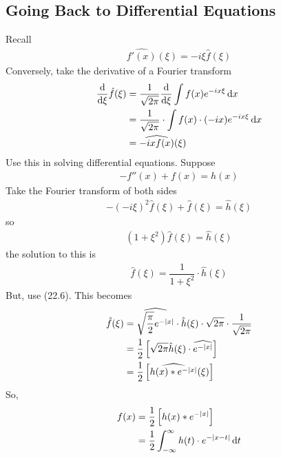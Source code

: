 \subsection{Going Back to Differential Equations}
Recall
\begin{align}
    \widehat{f'(x)}(\xi) = -i\xi \hat{f}(\xi)
\end{align}
Conversely, take the derivative of a Fourier transform
\begin{align}
    \dv{\xi} \hat{f}(\xi) &= \dfrac{1}{\sqrt{2\pi}} \dv{\xi} \int f(x) e^{-ix\xi} \dd{x}\\
    &= \dfrac{1}{\sqrt{2\pi}} \cdot \int f(x) \cdot (-ix) e^{-ix\xi} \dd{x}\\
    &= \widehat{-ix f(x)}(\xi)
\end{align}
Use this in solving differential equations. Suppose
\begin{align}
    -f''(x) + f(x) = h(x)
\end{align}
Take the Fourier transform of both sides
\begin{align}
    -(-i\xi)^2 \hat{f}(\xi) + \hat{f}(\xi) = \hat{h}(\xi)
\end{align}
so
\begin{align}
    (1 + \xi^2) \hat{f}(\xi) = \hat{h}(\xi)
\end{align}
the solution to this is
\begin{align}
    \hat{f}(\xi) = \dfrac{1}{1+\xi^2} \cdot \hat{h}(\xi)
\end{align}
But, use (22.6). This becomes
\begin{align}
    \hat{f}(\xi) &= \widehat{\sqrt{\frac{\pi}{2}} e^{-\abs{x}}} \cdot \hat{h}(\xi) \cdot \sqrt{2\pi} \cdot \dfrac{1}{\sqrt{2\pi}}\\
    &= \dfrac{1}{2} \left[ \sqrt{2\pi} \hat{h}(\xi) \cdot \widehat{e^{-\abs{x}}} \right]\\
    &= \dfrac{1}{2} \left[ \widehat{h(x) * e^{-\abs{x}}}(\xi) \right]
\end{align}
So,
\begin{align}
    f(x) &= \dfrac{1}{2} \left[ h(x) * e^{-\abs{x}} \right]\\
    &= \dfrac{1}{2} \int_{-\infty}^\infty h(t) \cdot e^{-\abs{x-t}} \dd{t}
\end{align}

